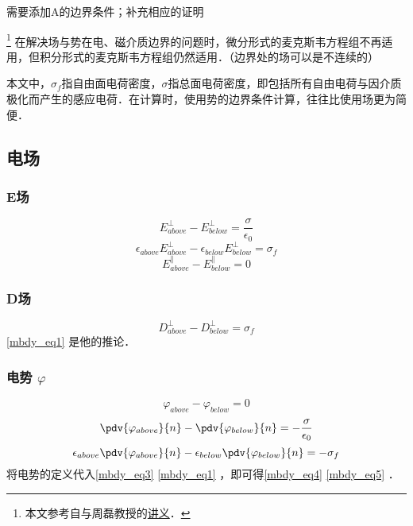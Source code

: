 
\begin{issues}
\issueTODO 需要添加A的边界条件；补充相应的证明
\end{issues}

\footnote{本文参考自\cite{GriffE}与周磊教授的\href{http://fdjpkc.fudan.edu.cn/d200927/2009/0314/c8569a14801/page.htm}{讲义}．}
在解决场与势在电、磁介质边界的问题时，微分形式的麦克斯韦方程组不再适用，但积分形式的麦克斯韦方程组仍然适用．（边界处的场可以是不连续的）

本文中，$\sigma_f$指自由面电荷密度，$\sigma$指总面电荷密度，即包括所有自由电荷与因介质极化而产生的感应电荷．在计算时，使用势的边界条件计算，往往比使用场更为简便．

\subsection{电场}

\subsubsection{E场}
\begin{equation}\label{mbdy_eq3}
E^\perp_{above} - E^\perp_{below} = \frac{\sigma}{\epsilon_0}
\end{equation}
\begin{equation}\label{mbdy_eq1}
\epsilon_{above}E^\perp_{above} - \epsilon_{below}E^\perp_{below} = \sigma_f
\end{equation}
\begin{equation}
E^\parallel_{above} - E^\parallel_{below} = 0
\end{equation}

\subsubsection{D场}
\begin{equation}
D^\perp_{above} - D^\perp_{below} = \sigma_f
\end{equation}
\autoref{mbdy_eq1} 是他的推论．

\subsubsection{电势 $\varphi$}
\begin{equation}
\varphi_{above}-\varphi_{below}=0
\end{equation}
\begin{equation}\label{mbdy_eq4}
\pdv{\varphi_{above}}{n} - \pdv{\varphi_{below}}{n}  = -\frac{\sigma}{\epsilon_0}
\end{equation}
\begin{equation}\label{mbdy_eq5}
\epsilon_{above}\pdv{\varphi_{above}}{n} - \epsilon_{below}\pdv{\varphi_{below}}{n}  = -\sigma_f
\end{equation}
将电势的定义代入\autoref{mbdy_eq3} \autoref{mbdy_eq1} ，即可得\autoref{mbdy_eq4} \autoref{mbdy_eq5} ．
